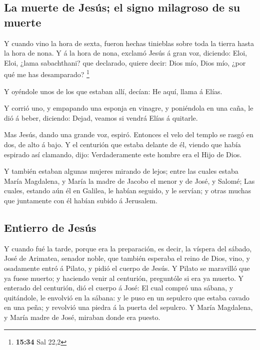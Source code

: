 \hypertarget{la-muerte-de-jesuxfas-el-signo-milagroso-de-su-muerte}{%
\subsection{La muerte de Jesús; el signo milagroso de su
muerte}\label{la-muerte-de-jesuxfas-el-signo-milagroso-de-su-muerte}}

 Y cuando vino la hora de sexta, fueron hechas tinieblas
sobre toda la tierra hasta la hora de nona.  Y á la hora de
nona, exclamó Jesús á gran voz, diciendo: Eloi, Eloi, ¿lama sabachthani?
que declarado, quiere decir: Dios mío, Dios mío, ¿por qué me has
desamparado? \footnote{\textbf{15:34} Sal 22,2}

 Y oyéndole unos de los que estaban allí, decían: He aquí,
llama á Elías.

 Y corrió uno, y empapando una esponja en vinagre, y
poniéndola en una caña, le dió á beber, diciendo: Dejad, veamos si
vendrá Elías á quitarle.

 Mas Jesús, dando una grande voz, espiró. 
Entonces el velo del templo se rasgó en dos, de alto á bajo.
 Y el centurión que estaba delante de él, viendo que había
espirado así clamando, dijo: Verdaderamente este hombre era el Hijo de
Dios.

 Y también estaban algunas mujeres mirando de lejos; entre
las cuales estaba María Magdalena, y María la madre de Jacobo el menor y
de José, y Salomé;  Las cuales, estando aún él en Galilea,
le habían seguido, y le servían; y otras muchas que juntamente con él
habían subido á Jerusalem.

\hypertarget{entierro-de-jesuxfas}{%
\subsection{Entierro de Jesús}\label{entierro-de-jesuxfas}}

 Y cuando fué la tarde, porque era la preparación, es
decir, la víspera del sábado,  José de Arimatea, senador
noble, que también esperaba el reino de Dios, vino, y osadamente entró á
Pilato, y pidió el cuerpo de Jesús.  Y Pilato se maravilló
que ya fuese muerto; y haciendo venir al centurión, preguntóle si era ya
muerto.  Y enterado del centurión, dió el cuerpo á José:
 El cual compró una sábana, y quitándole, le envolvió en la
sábana: y le puso en un sepulcro que estaba cavado en una peña; y
revolvió una piedra á la puerta del sepulcro.  Y María
Magdalena, y María madre de José, miraban donde era puesto.

